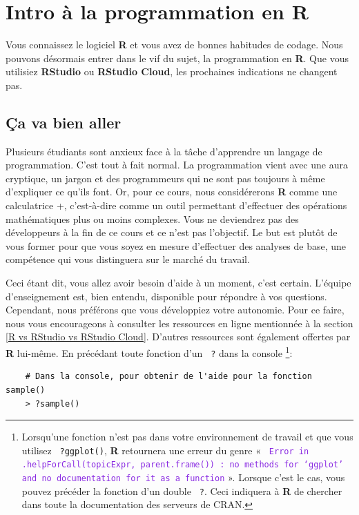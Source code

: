 \documentclass[10.5pt,a4paper]{article}
\newcommand{\rcode}[1]{\texttt{\color{rstudio} #1}}
\begin{document}
       
        
\section{Intro à la programmation en R}
Vous connaissez le logiciel \textbf{R} et vous avez de bonnes habitudes de codage. Nous pouvons désormais entrer dans le vif du sujet, la programmation en \textbf{R}. Que vous utilisiez \textbf{RStudio} ou \textbf{RStudio Cloud}, les prochaines indications ne changent pas. 
      
  \subsection{Ça va bien aller}
  Plusieurs étudiants sont anxieux face à la tâche d'apprendre un langage de programmation. C'est tout à fait normal. La programmation vient avec une aura cryptique, un jargon et des programmeurs qui ne sont pas toujours à même d'expliquer ce qu'ils font. Or, pour ce cours, nous considérerons \textbf{R} comme une calculatrice +, c'est-à-dire comme un outil permettant d'effectuer des opérations mathématiques plus ou moins complexes. Vous ne deviendrez pas des développeurs à la fin de ce cours et ce n'est pas l'objectif. Le but est plutôt de vous former pour que vous soyez en mesure d'effectuer des analyses de base, une compétence qui vous distinguera sur le marché du travail.

Ceci étant dit, vous allez avoir besoin d'aide à un moment, c'est certain. L'équipe d'enseignement est, bien entendu, disponible pour répondre à vos questions. Cependant, nous préférons que vous développiez votre autonomie. Pour ce faire, nous vous encourageons à consulter les ressources en ligne mentionnée à la section \ref{R vs RStudio vs RStudio Cloud}. D'autres ressources sont également offertes par \textbf{R} lui-même. En précédant toute fonction d'un \rcode{?} dans la console \footnote{Lorsqu'une fonction n'est pas dans votre environnement de travail et que vous utilisez \rcode{?ggplot()}, \textbf{R} retournera une erreur du genre « \textcolor{BlueViolet}{\rcode{Error in .helpForCall(topicExpr, parent.frame()) : no methods for ‘ggplot’ and no documentation for it as a function}} ». Lorsque c'est le cas, vous pouvez précéder la fonction d'un double \rcode{?}. Ceci indiquera à \textbf{R} de chercher dans toute la documentation des serveurs de CRAN.}:

  \begin{lstlisting}
    # Dans la console, pour obtenir de l'aide pour la fonction sample()
    > ?sample()
  \end{lstlisting}
  
\end{document}
